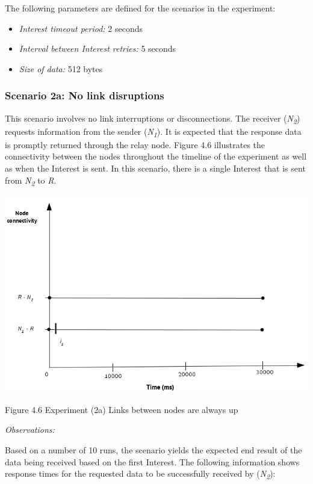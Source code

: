 \documentclass[a4paper,12pt]{report}      %
\begin{document}
\noindent The following parameters are defined for the scenarios in the experiment:
\begin{itemize}
\item \textsl{Interest timeout period:}  2 seconds
\item \textsl{Interval between Interest retries:} 5 seconds
\item \textsl{Size of data:} 512 bytes
\end{itemize}

\subsubsection{Scenario 2a: No link disruptions}

This scenario involves no link interruptions or disconnections. The receiver (\emph{N\textsubscript{2}}) requests information from
the sender (\emph{N\textsubscript{1}}). It is expected that the response data is promptly returned through the relay node. Figure 4.6 illustrates the connectivity between the nodes throughout the timeline of the experiment as well as when the Interest is sent. In this scenario, there is a single Interest that is sent from \emph{N\textsubscript{2}} to \emph{R}.

\noindent\includegraphics[scale=0.55]{exp2a_timediag.jpg}\newline
\begin{center}Figure 4.6 Experiment (2a) Links between nodes are always up\end{center}

\vspace*{1\baselineskip}\noindent\emph{Observations:}

Based on a number of 10 runs, the scenario yields the expected end result of the data being received
based on the first Interest. The following information shows response times for the requested
data to be successfully received by (\emph{N\textsubscript{2}}):
\end{document}

